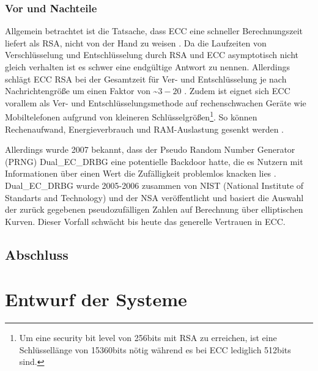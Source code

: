 \documentclass[11pt,a4paper]{scrreprt}
\begin{document}
\subsection{Vor und Nachteile}
Allgemein betrachtet ist die Tatsache, dass ECC eine schneller Berechnungszeit liefert als RSA, nicht von der Hand zu weisen \cite{ecc-cloud2013elliptic}. Da die Laufzeiten von Verschlüsselung und Entschlüsselung durch RSA und ECC asymptotisch nicht gleich verhalten ist es schwer eine endgültige Antwort zu nennen. Allerdings schlägt ECC RSA bei der Gesamtzeit für Ver- und Entschlüsselung je nach Nachrichtengröße um einen Faktor von \textasciitilde $3-20$ \cite{ecc-mahto2018performance}\cite{ecc-bao2022research}. Zudem ist eignet sich ECC vorallem als Ver- und Entschlüsselungsmethode auf rechenschwachen Geräte wie Mobiltelefonen aufgrund von kleineren Schlüsselgrößen\footnote{Um eine security bit level von 256bits mit RSA zu erreichen, ist eine Schlüssellänge von 15360bits nötig während es bei ECC lediglich 512bits sind.\cite{ecc-mahto2018performance}}. So können Rechenaufwand, Energieverbrauch und RAM-Auslastung gesenkt werden \cite{ecc-gupta2011ecc}.

Allerdings wurde 2007 bekannt, dass der Pseudo Random Number Generator (PRNG) Dual\_EC\_DRBG eine potentielle Backdoor hatte, die es Nutzern mit Informationen über einen Wert die Zufälligkeit problemlos knacken lies \cite{ecc-green2013backdoor}. Dual\_EC\_DRBG wurde 2005-2006 zusammen von NIST (National Institute of Standarts and Technology) und der NSA veröffentlicht und basiert die Auswahl der zurück gegebenen pseudozufälligen Zahlen auf Berechnung über elliptischen Kurven. Dieser Vorfall schwächt bis heute das generelle Vertrauen in ECC.

\cite{ecc-cloud2013elliptic}

\section{Abschluss}




\chapter{Entwurf der Systeme}
\end{document}
